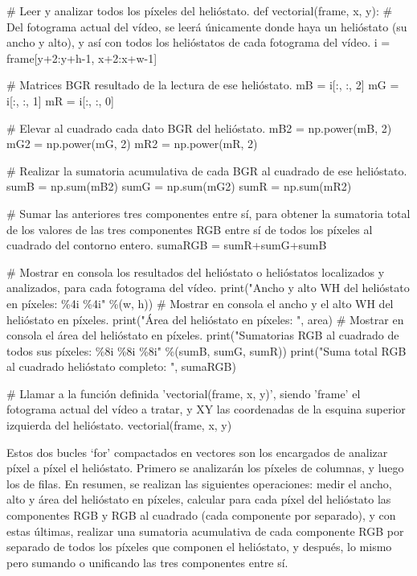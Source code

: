 \documentclass[12pt]{article}
\begin{document}
            \# Leer y analizar todos los píxeles del helióstato.
            def vectorial(frame, x, y):
                \# Del fotograma actual del vídeo, se leerá únicamente donde haya un helióstato (su ancho y alto), y así con todos los helióstatos de cada fotograma del vídeo.
                i = frame[y+2:y+h-1, x+2:x+w-1]
                
                \# Matrices BGR resultado de la lectura de ese helióstato.
                mB = i[:, :, 2]
                mG = i[:, :, 1]
                mR = i[:, :, 0]
                                
                \# Elevar al cuadrado cada dato BGR del helióstato.
                mB2 = np.power(mB, 2)
                mG2 = np.power(mG, 2)
                mR2 = np.power(mR, 2)

                \# Realizar la sumatoria acumulativa de cada BGR al cuadrado de ese helióstato.
                sumB = np.sum(mB2)
                sumG = np.sum(mG2)
                sumR = np.sum(mR2)

                \# Sumar las anteriores tres componentes entre sí, para obtener la sumatoria total de los valores de las tres componentes RGB entre sí de todos los píxeles al cuadrado del contorno entero.
                sumaRGB = sumR+sumG+sumB
                
                \# Mostrar en consola los resultados del helióstato o helióstatos localizados y analizados, para cada fotograma del vídeo.
                print("Ancho y alto WH del helióstato en píxeles:       \%4i \%4i" \%(w, h)) \# Mostrar en consola el ancho y el alto WH del helióstato en píxeles.
                print("Área del helióstato en píxeles:                  ", area) \# Mostrar en consola el área del helióstato en píxeles.
                print("Sumatorias RGB al cuadrado de todos sus píxeles: \%8i \%8i \%8i" \%(sumB, sumG, sumR))
                print("Suma total RGB al cuadrado helióstato completo:  ", sumaRGB)

            \# Llamar a la función definida 'vectorial(frame, x, y)', siendo 'frame' el fotograma actual del vídeo a tratar, y XY las coordenadas de la esquina superior izquierda del helióstato.
            vectorial(frame, x, y)
        
Estos dos bucles ‘for’ compactados en vectores son los encargados de analizar píxel a píxel el helióstato. Primero se analizarán los píxeles de columnas, y luego los de filas. En resumen, se realizan las siguientes operaciones: medir el ancho, alto y área del helióstato en píxeles, calcular para cada píxel del helióstato las componentes RGB y RGB al cuadrado (cada componente por separado), y con estas últimas, realizar una sumatoria acumulativa de cada componente RGB por separado de todos los píxeles que componen el helióstato, y después, lo mismo pero sumando o unificando las tres componentes entre sí.
\end{document}
